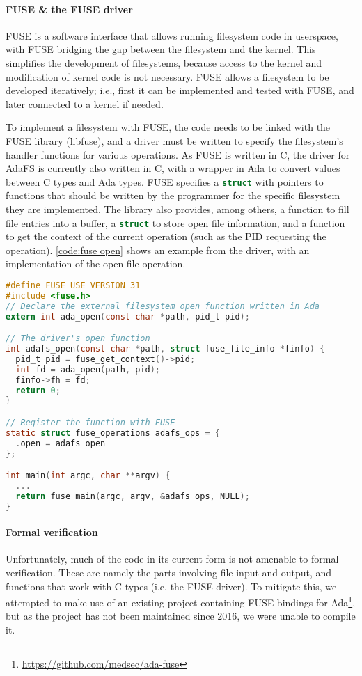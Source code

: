 \paragraph{FUSE \& the FUSE driver}
FUSE is a software interface that allows running filesystem code in userspace, with FUSE bridging the gap between the filesystem and the kernel.
This simplifies the development of filesystems, because access to the kernel and modification of kernel code is not necessary.
FUSE allows a filesystem to be developed iteratively; i.e., first it can be implemented and tested with FUSE, and later connected to a kernel if needed.

To implement a filesystem with FUSE, the code needs to be linked with the FUSE library (libfuse), and a driver must be written to specify the filesystem's handler functions for various operations.
As FUSE is written in C, the driver for AdaFS is currently also written in C, with a wrapper in Ada to convert values between C types and Ada types.
FUSE specifies a \lstinline[language=C]{struct} with pointers to functions that should be written by the programmer for the specific filesystem they are implemented.
The library also provides, among others, a function to fill file entries into a buffer, a \lstinline[language=C]{struct} to store open file information, and a function to get the context of the current operation (such as the PID requesting the operation).
\autoref{code:fuse open} shows an example from the driver, with an implementation of the open file operation.

\begin{lstlisting}[caption={FUSE driver implementation of \textnormal{open}}, label={code:fuse open}, language=C]
#define FUSE_USE_VERSION 31
#include <fuse.h>
// Declare the external filesystem open function written in Ada
extern int ada_open(const char *path, pid_t pid);

// The driver's open function
int adafs_open(const char *path, struct fuse_file_info *finfo) {
  pid_t pid = fuse_get_context()->pid;
  int fd = ada_open(path, pid);
  finfo->fh = fd;
  return 0;
}

// Register the function with FUSE
static struct fuse_operations adafs_ops = {
  .open = adafs_open
};

int main(int argc, char **argv) {
  ...
  return fuse_main(argc, argv, &adafs_ops, NULL);
}
\end{lstlisting}

\paragraph{Formal verification}
Unfortunately, much of the code in its current form is not amenable to formal verification.
These are namely the parts involving file input and output, and functions that work with C types (i.e. the FUSE driver).
To mitigate this, we attempted to make use of an existing project containing FUSE bindings for Ada\footnote{\url{https://github.com/medsec/ada-fuse}}, but as the project has not been maintained since 2016, we were unable to compile it.

